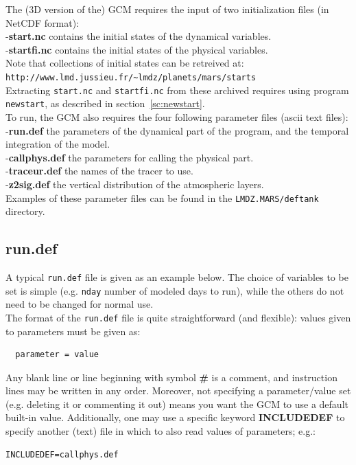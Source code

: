 \label{loc:entrees}

The (3D version of the) GCM requires
the input of two initialization files (in NetCDF format):\\
-{\bf start.nc}
contains the initial states of the dynamical variables.\\
-{\bf startfi.nc}
contains the initial states of the physical variables.\\
Note that collections of initial states can be retreived at:\\
\verb+http://www.lmd.jussieu.fr/~lmdz/planets/mars/starts+ \\
Extracting {\tt start.nc} and {\tt startfi.nc} from these archived
requires using program {\tt newstart}, as described in
section~\ref{sc:newstart}.\\

\noindent
To run, the GCM also requires the  four following
parameter files (ascii text files):\\
-{\bf run.def} the parameters of the dynamical part of the program,
and the temporal integration of the model.\\
-{\bf callphys.def} the parameters for calling the physical part.\\
-{\bf traceur.def} the names of the tracer to use.\\
-{\bf z2sig.def}
 the vertical distribution of the atmospheric layers.\\
Examples of these parameter files can be found in the
\verb+LMDZ.MARS/deftank+ directory.

\subsection{run.def}
\label{vb:run.def}

A typical {\tt run.def} file is given as an example below.
The choice of variables to be set is simple (e.g.
 {\tt nday} number of modeled days to run),
while the others do not need to be changed for normal use.\\
The format of the {\tt run.def} file is quite straightforward
(and flexible): values given to parameters must be given as:
\begin{verbatim}
  parameter = value
\end{verbatim}
Any blank line or line beginning with symbol {\bf \#} is
a comment, and instruction lines may be written in any order.
Moreover, not specifying a parameter/value set (e.g. deleting it
or commenting it out) means you want the GCM to use a default built-in value.
Additionally, one may use a specific keyword {\bf INCLUDEDEF} to specify
another (text) file in which to also read values of parameters; e.g.:
\begin{verbatim}
INCLUDEDEF=callphys.def
\end{verbatim}


